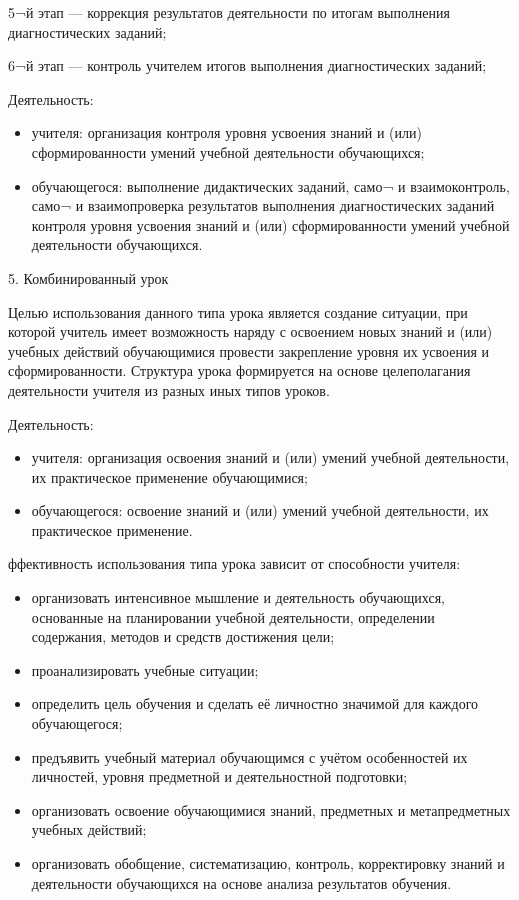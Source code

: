 \documentclass[
  11pt,
]{book}
\begin{document}
5¬й этап --- коррекция результатов деятельности по итогам выполнения диагностических заданий;

6¬й этап --- контроль учителем итогов выполнения диагностических заданий;

Деятельность:

\begin{itemize}
\item
  учителя: организация контроля уровня усвоения знаний и (или) сформированности умений учебной деятельности обучающихся;
\item
  обучающегося: выполнение дидактических заданий, само¬ и взаимоконтроль, само¬ и взаимопроверка результатов выполнения диагностических заданий контроля уровня усвоения знаний и (или) сформированности умений учебной деятельности обучающихся.
\end{itemize}

5. Комбинированный урок

Целью использования данного типа урока является создание ситуации, при которой учитель имеет возможность наряду с освоением новых знаний и (или) учебных действий обучающимися провести закрепление уровня их усвоения и сформированности. Структура урока формируется на основе целеполагания деятельности учителя из разных иных типов уроков.

Деятельность:

\begin{itemize}
\item
  учителя: организация освоения знаний и (или) умений учебной деятельности, их практическое применение обучающимися;
\item
  обучающегося: освоение знаний и (или) умений учебной деятельности, их практическое применение.
\end{itemize}

ффективность использования типа урока зависит от способности учителя:

\begin{itemize}
\item
  организовать интенсивное мышление и деятельность обучающихся, основанные на планировании учебной деятельности, определении содержания, методов и средств достижения цели;
\item
  проанализировать учебные ситуации;
\item
  определить цель обучения и сделать её личностно значимой для каждого обучающегося;
\item
  предъявить учебный материал обучающимся с учётом особенностей их личностей, уровня предметной и деятельностной подготовки;
\item
  организовать освоение обучающимися знаний, предметных и метапредметных учебных действий;
\item
  организовать обобщение, систематизацию, контроль, корректировку знаний и деятельности обучающихся на основе анализа результатов обучения.
\end{itemize}
\end{document}
